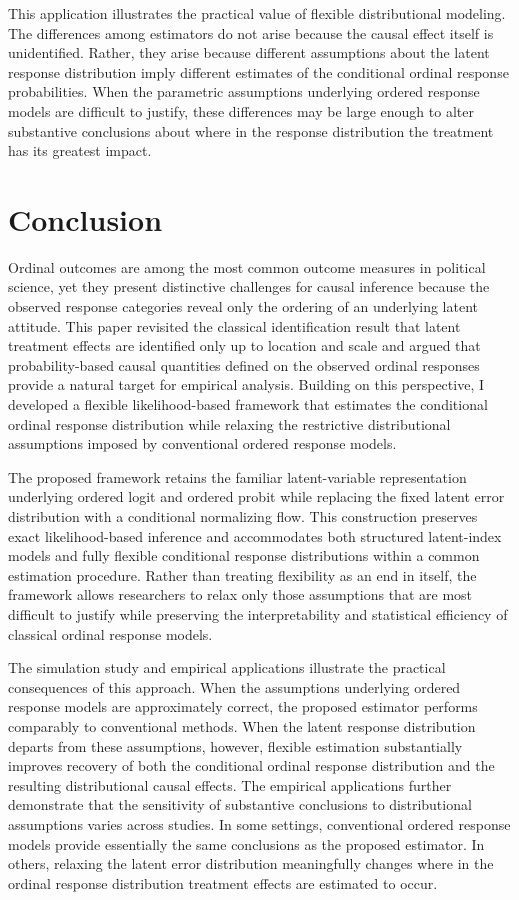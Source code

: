\documentclass{article}
\begin{document}
This application illustrates the practical value of flexible distributional modeling. The differences among estimators do not arise because the causal effect itself is unidentified. Rather, they arise because different assumptions about the latent response distribution imply different estimates of the conditional ordinal response probabilities. When the parametric assumptions underlying ordered response models are difficult to justify, these differences may be large enough to alter substantive conclusions about where in the response distribution the treatment has its greatest impact.

\section{Conclusion}
\label{sec:conclusion}

Ordinal outcomes are among the most common outcome measures in political science, yet they present distinctive challenges for causal inference because the observed response categories reveal only the ordering of an underlying latent attitude. This paper revisited the classical identification result that latent treatment effects are identified only up to location and scale and argued that probability-based causal quantities defined on the observed ordinal responses provide a natural target for empirical analysis. Building on this perspective, I developed a flexible likelihood-based framework that estimates the conditional ordinal response distribution while relaxing the restrictive distributional assumptions imposed by conventional ordered response models.

The proposed framework retains the familiar latent-variable representation underlying ordered logit and ordered probit while replacing the fixed latent error distribution with a conditional normalizing flow. This construction preserves exact likelihood-based inference and accommodates both structured latent-index models and fully flexible conditional response distributions within a common estimation procedure. Rather than treating flexibility as an end in itself, the framework allows researchers to relax only those assumptions that are most difficult to justify while preserving the interpretability and statistical efficiency of classical ordinal response models.

The simulation study and empirical applications illustrate the practical consequences of this approach. When the assumptions underlying ordered response models are approximately correct, the proposed estimator performs comparably to conventional methods. When the latent response distribution departs from these assumptions, however, flexible estimation substantially improves recovery of both the conditional ordinal response distribution and the resulting distributional causal effects. The empirical applications further demonstrate that the sensitivity of substantive conclusions to distributional assumptions varies across studies. In some settings, conventional ordered response models provide essentially the same conclusions as the proposed estimator. In others, relaxing the latent error distribution meaningfully changes where in the ordinal response distribution treatment effects are estimated to occur.
\end{document}
